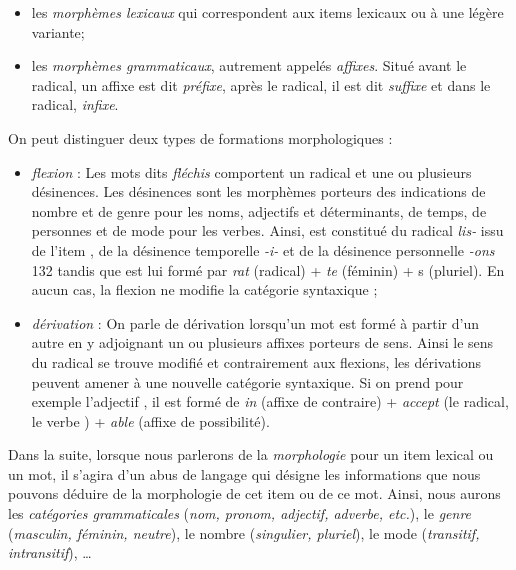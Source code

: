   \begin{itemize}
    
  \item les \emph{morphèmes lexicaux} qui correspondent aux items
    lexicaux ou à une légère variante;
  \item les \emph{morphèmes grammaticaux}, autrement appelés
    \emph{affixes}. Situé avant le radical, un affixe est dit
    \emph{préfixe}, après le radical, il est dit \emph{suffixe} et
    dans le radical, \emph{infixe}.

  \end{itemize}
  
  On peut distinguer deux types de formations morphologiques :

\begin{itemize}
\item \emph{flexion} : Les mots dits \emph{fléchis} comportent un
  radical et une ou plusieurs désinences. Les désinences sont les
  morphèmes porteurs des indications de nombre et de genre pour les
  noms, adjectifs et déterminants, de temps, de personnes et de mode
  pour les verbes. Ainsi,  est constitué du radical
  \emph{lis-} issu de l'item , de la désinence
  temporelle \emph{-i-} et de la désinence personnelle \emph{-ons}
  \citep{Lehmann1998}{132} tandis que  est lui formé par
  \emph{rat} (radical) + \emph{te} (féminin) + s (pluriel). En aucun
  cas, la flexion ne modifie la catégorie syntaxique ;
  
\item \emph{dérivation} : On parle de dérivation lorsqu'un mot est
  formé à partir d'un autre en y adjoignant un ou plusieurs affixes
  porteurs de sens. Ainsi le sens du radical se trouve modifié et
  contrairement aux flexions, les dérivations peuvent amener à une
  nouvelle catégorie syntaxique. Si on prend pour exemple l'adjectif
  , il est formé de \emph{in} (affixe de contraire)
  + \emph{accept} (le radical, le verbe ) +
  \emph{able} (affixe de possibilité).
\end{itemize}

Dans la suite, lorsque nous parlerons de la \emph{morphologie} pour un
item lexical ou un mot, il s'agira d'un abus de langage qui désigne
les informations que nous pouvons déduire de la morphologie de cet
item ou de ce mot. Ainsi, nous aurons les \emph{catégories
  grammaticales} (\emph{nom, pronom, adjectif, adverbe, etc.}), le
\emph{genre} (\emph{masculin, féminin, neutre}), le nombre
(\emph{singulier, pluriel}), le mode (\emph{transitif, intransitif}),
\ldots

